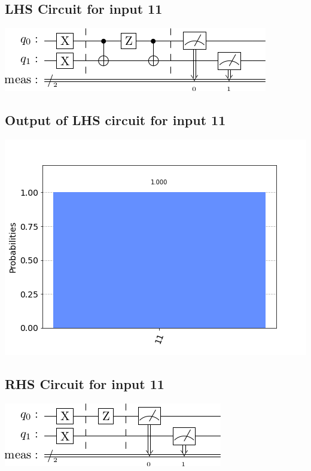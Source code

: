 \documentclass[a4paper]{article}
\begin{document}
\begin{answer}[Question 1 b (b)]
        \subsection*{LHS Circuit for input 11}
        \includegraphics[scale=0.5]{b111.png}
        \subsection*{Output of LHS circuit for input 11}
        \includegraphics[scale = 0.5]{b111-out.png}
        \subsection*{RHS Circuit for input 11}
        \includegraphics[scale=0.5]{b211.png}

\end{answer}
\end{document}
